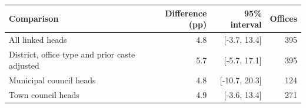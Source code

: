 \begin{tabular}{lrrr}
\toprule
Comparison & Difference (pp) & 95\% interval & Offices \\
\midrule
All linked heads & 4.8 & [-3.7, 13.4] & 395 \\
District, office type and prior caste adjusted & 5.7 & [-5.7, 17.1] & 395 \\
Municipal council heads & 4.8 & [-10.7, 20.3] & 124 \\
Town council heads & 4.9 & [-3.6, 13.4] & 271 \\
\bottomrule
\end{tabular}

